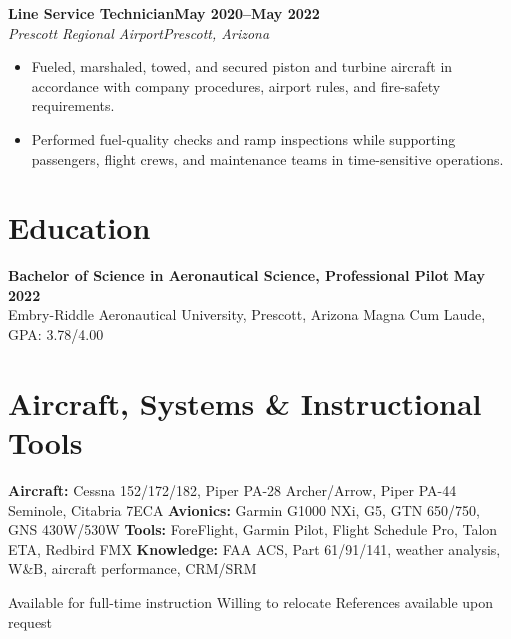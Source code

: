 \documentclass[10pt,letterpaper]{article}
\newcommand{\job}[4]{%
  \textbf{#1}\hfill\textbf{#2}\\[-0.15em]
  \textit{#3}\hfill\textit{#4}\par
}
\begin{document}
\job{Line Service Technician}{May 2020--May 2022}{Prescott Regional Airport}{Prescott, Arizona}
\begin{itemize}
  \item Fueled, marshaled, towed, and secured piston and turbine aircraft in accordance with company procedures, airport rules, and fire-safety requirements.
  \item Performed fuel-quality checks and ramp inspections while supporting passengers, flight crews, and maintenance teams in time-sensitive operations.
\end{itemize}

\section*{Education}
\textbf{Bachelor of Science in Aeronautical Science, Professional Pilot}
\hfill\textbf{May 2022}\\[-0.15em]
Embry-Riddle Aeronautical University, Prescott, Arizona
\hfill Magna Cum Laude, GPA: 3.78/4.00

\section*{Aircraft, Systems \& Instructional Tools}
\textbf{Aircraft:} Cessna 152/172/182, Piper PA-28 Archer/Arrow, Piper PA-44 Seminole, Citabria 7ECA \quad
\textbf{Avionics:} Garmin G1000 NXi, G5, GTN 650/750, GNS 430W/530W \quad
\textbf{Tools:} ForeFlight, Garmin Pilot, Flight Schedule Pro, Talon ETA, Redbird FMX \quad
\textbf{Knowledge:} FAA ACS, Part 61/91/141, weather analysis, W\&B, aircraft performance, CRM/SRM

\vfill
\begin{center}
  \footnotesize\color{slate}
  Available for full-time instruction \textbar{} Willing to relocate \textbar{} References available upon request
\end{center}
\end{document}
